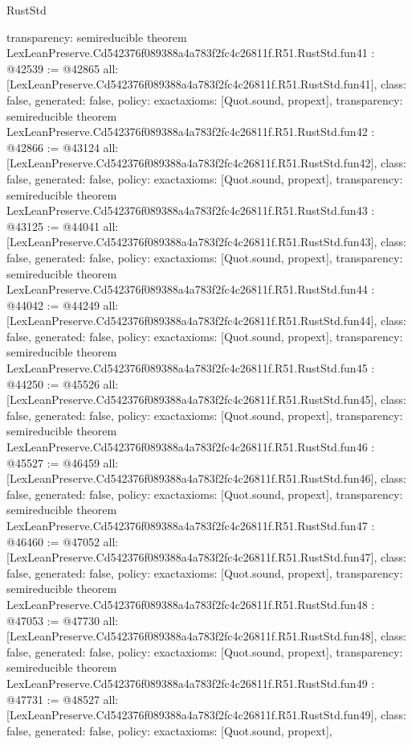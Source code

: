 \begin{lexlean}{RustStd}
\begin{coremodule}
{  transparency: semireducible
}
theorem LexLeanPreserve.Cd542376f089388a4a783f2fc4c26811f.R51.RustStd.fun41 : @42539 := @42865 {
  all: [LexLeanPreserve.Cd542376f089388a4a783f2fc4c26811f.R51.RustStd.fun41],
  class: false,
  generated: false,
  policy: exact{axioms: [Quot.sound, propext]},
  transparency: semireducible
}
theorem LexLeanPreserve.Cd542376f089388a4a783f2fc4c26811f.R51.RustStd.fun42 : @42866 := @43124 {
  all: [LexLeanPreserve.Cd542376f089388a4a783f2fc4c26811f.R51.RustStd.fun42],
  class: false,
  generated: false,
  policy: exact{axioms: [Quot.sound, propext]},
  transparency: semireducible
}
theorem LexLeanPreserve.Cd542376f089388a4a783f2fc4c26811f.R51.RustStd.fun43 : @43125 := @44041 {
  all: [LexLeanPreserve.Cd542376f089388a4a783f2fc4c26811f.R51.RustStd.fun43],
  class: false,
  generated: false,
  policy: exact{axioms: [Quot.sound, propext]},
  transparency: semireducible
}
theorem LexLeanPreserve.Cd542376f089388a4a783f2fc4c26811f.R51.RustStd.fun44 : @44042 := @44249 {
  all: [LexLeanPreserve.Cd542376f089388a4a783f2fc4c26811f.R51.RustStd.fun44],
  class: false,
  generated: false,
  policy: exact{axioms: [Quot.sound, propext]},
  transparency: semireducible
}
theorem LexLeanPreserve.Cd542376f089388a4a783f2fc4c26811f.R51.RustStd.fun45 : @44250 := @45526 {
  all: [LexLeanPreserve.Cd542376f089388a4a783f2fc4c26811f.R51.RustStd.fun45],
  class: false,
  generated: false,
  policy: exact{axioms: [Quot.sound, propext]},
  transparency: semireducible
}
theorem LexLeanPreserve.Cd542376f089388a4a783f2fc4c26811f.R51.RustStd.fun46 : @45527 := @46459 {
  all: [LexLeanPreserve.Cd542376f089388a4a783f2fc4c26811f.R51.RustStd.fun46],
  class: false,
  generated: false,
  policy: exact{axioms: [Quot.sound, propext]},
  transparency: semireducible
}
theorem LexLeanPreserve.Cd542376f089388a4a783f2fc4c26811f.R51.RustStd.fun47 : @46460 := @47052 {
  all: [LexLeanPreserve.Cd542376f089388a4a783f2fc4c26811f.R51.RustStd.fun47],
  class: false,
  generated: false,
  policy: exact{axioms: [Quot.sound, propext]},
  transparency: semireducible
}
theorem LexLeanPreserve.Cd542376f089388a4a783f2fc4c26811f.R51.RustStd.fun48 : @47053 := @47730 {
  all: [LexLeanPreserve.Cd542376f089388a4a783f2fc4c26811f.R51.RustStd.fun48],
  class: false,
  generated: false,
  policy: exact{axioms: [Quot.sound, propext]},
  transparency: semireducible
}
theorem LexLeanPreserve.Cd542376f089388a4a783f2fc4c26811f.R51.RustStd.fun49 : @47731 := @48527 {
  all: [LexLeanPreserve.Cd542376f089388a4a783f2fc4c26811f.R51.RustStd.fun49],
  class: false,
  generated: false,
  policy: exact{axioms: [Quot.sound, propext]},
}
\end{coremodule}
\end{lexlean}
